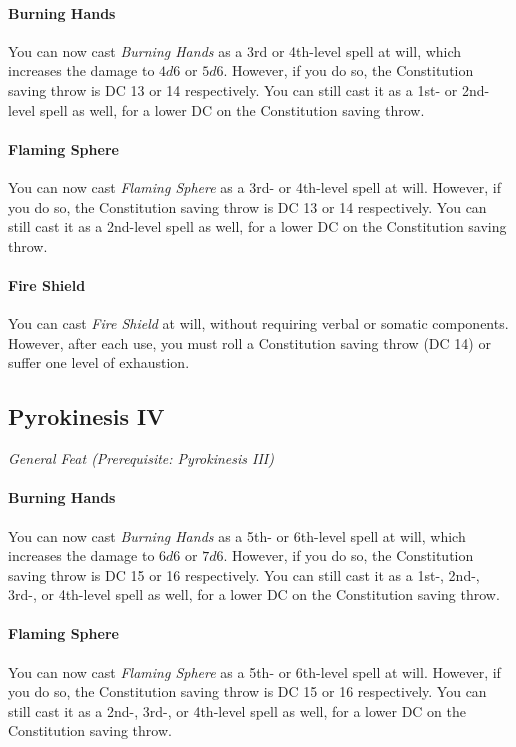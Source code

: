 \documentclass[twocolumn]{dndbook}
\begin{document}
\paragraph*{Burning Hands} You can now cast \emph{Burning Hands} as a 3rd or 4th-level spell at will,
which increases the damage to $ 4d6 $ or $ 5d6 $. However, if you do so, the Constitution saving throw is DC 13 or 14 respectively.
You can still cast it as a 1st- or 2nd-level spell as well, for a lower DC on the Constitution saving throw.
\paragraph*{Flaming Sphere} You can now cast \emph{Flaming Sphere} as a 3rd- or 4th-level spell at will.
However, if you do so, the Constitution saving throw is DC 13 or 14 respectively.
You can still cast it as a 2nd-level spell as well, for a lower DC on the Constitution saving throw.
\paragraph*{Fire Shield} You can cast \emph{Fire Shield} at will,
without requiring verbal or somatic components. However, after each use, you must roll a Constitution saving throw (DC 14) or suffer one level of exhaustion.

\subsection{Pyrokinesis IV}
{\emph{General Feat (Prerequisite: Pyrokinesis III)}}\par
\paragraph*{Burning Hands} You can now cast \emph{Burning Hands} as a 5th- or 6th-level spell at will,
which increases the damage to $ 6d6 $ or $ 7d6 $. However, if you do so, the Constitution saving throw is DC 15 or 16 respectively.
You can still cast it as a 1st-, 2nd-, 3rd-, or 4th-level spell as well, for a lower DC on the Constitution saving throw.
\paragraph*{Flaming Sphere} You can now cast \emph{Flaming Sphere} as a 5th- or 6th-level spell at will.
However, if you do so, the Constitution saving throw is DC 15 or 16 respectively.
You can still cast it as a 2nd-, 3rd-, or 4th-level spell as well, for a lower DC on the Constitution saving throw.
\end{document}
